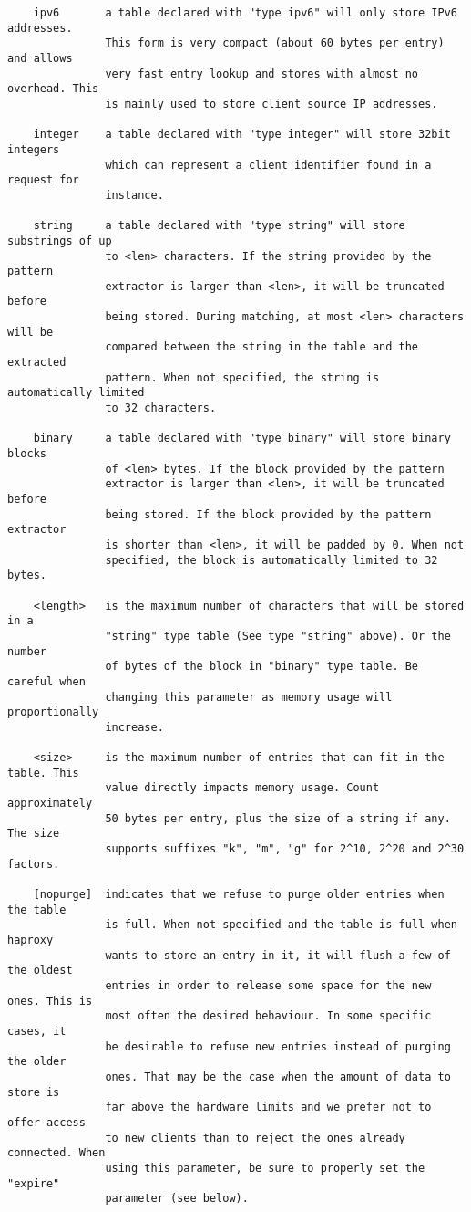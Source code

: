 \begin{verbatim}
    ipv6       a table declared with "type ipv6" will only store IPv6 addresses.
               This form is very compact (about 60 bytes per entry) and allows
               very fast entry lookup and stores with almost no overhead. This
               is mainly used to store client source IP addresses.

    integer    a table declared with "type integer" will store 32bit integers
               which can represent a client identifier found in a request for
               instance.

    string     a table declared with "type string" will store substrings of up
               to <len> characters. If the string provided by the pattern
               extractor is larger than <len>, it will be truncated before
               being stored. During matching, at most <len> characters will be
               compared between the string in the table and the extracted
               pattern. When not specified, the string is automatically limited
               to 32 characters.

    binary     a table declared with "type binary" will store binary blocks
               of <len> bytes. If the block provided by the pattern
               extractor is larger than <len>, it will be truncated before
               being stored. If the block provided by the pattern extractor
               is shorter than <len>, it will be padded by 0. When not
               specified, the block is automatically limited to 32 bytes.

    <length>   is the maximum number of characters that will be stored in a
               "string" type table (See type "string" above). Or the number
               of bytes of the block in "binary" type table. Be careful when
               changing this parameter as memory usage will proportionally
               increase.

    <size>     is the maximum number of entries that can fit in the table. This
               value directly impacts memory usage. Count approximately
               50 bytes per entry, plus the size of a string if any. The size
               supports suffixes "k", "m", "g" for 2^10, 2^20 and 2^30 factors.

    [nopurge]  indicates that we refuse to purge older entries when the table
               is full. When not specified and the table is full when haproxy
               wants to store an entry in it, it will flush a few of the oldest
               entries in order to release some space for the new ones. This is
               most often the desired behaviour. In some specific cases, it
               be desirable to refuse new entries instead of purging the older
               ones. That may be the case when the amount of data to store is
               far above the hardware limits and we prefer not to offer access
               to new clients than to reject the ones already connected. When
               using this parameter, be sure to properly set the "expire"
               parameter (see below).


\end{verbatim}

